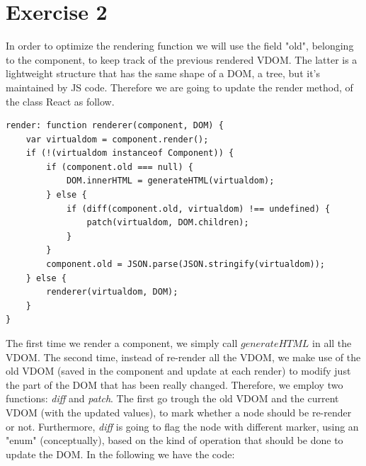 \documentclass[10pt]{article}
\begin{document}
\section*{Exercise 2}
In order to optimize the rendering function we will use the field "old", belonging to the component, to keep track of the previous rendered VDOM. The latter is a lightweight structure that has the same shape of a DOM, a tree, but it's maintained by JS code. Therefore we are going to update the render method, of the class React as follow.   
\begin{lstlisting}[caption=New render method]
render: function renderer(component, DOM) {
    var virtualdom = component.render();
    if (!(virtualdom instanceof Component)) {
        if (component.old === null) {
            DOM.innerHTML = generateHTML(virtualdom);
        } else {
            if (diff(component.old, virtualdom) !== undefined) {
                patch(virtualdom, DOM.children);
            }
        }
        component.old = JSON.parse(JSON.stringify(virtualdom));
    } else {
        renderer(virtualdom, DOM);
    }
}
\end{lstlisting}
The first time we render a component, we simply call $generateHTML$ in all the VDOM. The second time, instead of re-render all the VDOM, we make use of the old VDOM (saved in the component and update at each render) to modify just the part of the DOM that has been really changed. Therefore, we employ two functions: \textit{diff} and \textit{patch}. The first go trough the old VDOM and the current VDOM (with the updated values), to mark whether a node should be re-render or not. Furthermore, \textit{diff} is going to flag the node with different marker, using an "enum" (conceptually), based on the kind of operation that should be done to update the DOM. In the following we have the code: 
\end{document}
